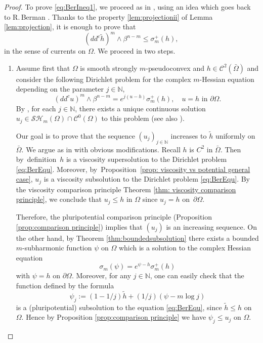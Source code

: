 \documentclass[JEP,XML,SOM,Unicode]{cedram}
\theoremstyle{definition}
\newcommand{\N}{\mathbb{N}}
\newcommand{\Cc}{\mathcal{C}}
\begin{document}
\begin{proof} To prove \eqref{eq:BerIneq1}, we proceed as in \cite{GLZ19}, using an idea which goes back to R.\,Berman \cite{Ber19}. Thanks to the property \eqref{lem:projectionii} of Lemma \ref{lem:projection}, it is enough to prove that
\begin{equation} \label{eq:BerIneq2}
(dd^c \tilde h)^m \wedge \beta^{n - m} \leq \sigma_m^+ (h),
\end{equation}
in the sense of currents on $\Omega$. We proceed in two steps.

\begin{enumerate}
\item
Assume first that $\Omega$ is smooth strongly $m$-pseudoconvex and $h \in \Cc^2 (\bar \Omega)$ and consider the following Dirichlet problem for the complex $m$-Hessian equation depending on the parameter $j \in \N$,
\begin{equation} \label{eq:BerEqu}
(dd^c u)^m \wedge \beta^{n - m} = e^{j (u-h)} \sigma_m^+ (h), \quad u = h\text{ in }\partial \Omega.
\end{equation}
By \cite{Lu13}, for each $j\!\in\!\N$, there exists a unique continuous solution $u_j\!\in\!\mathcal {SH}_m (\Omega) \cap\Cc^0 (\Omega)$ to this problem (see also \cite{Ch16}).

Our goal is to prove that the sequence $(u_j)_{j\in \N}$ increases to $ \tilde h$ uniformly on $\bar{\Omega}$. We argue as in \cite{GLZ19} with obvious modifications. Recall $h$ is $C^2$ in $\bar{\Omega}$. Then by~definition~$h$ is a viscosity supersolution to the Dirichlet problem \eqref{eq:BerEqu}. Moreover, by~Proposition~\ref{prop: viscosity vs potential general case}, $u_j$ is a viscosity subsolution to the Dirichlet problem \eqref{eq:BerEqu}. By the viscosity comparison principle Theorem \ref{thm: viscosity comparison principle}, we conclude that $u_j \leq h$ in $ \Omega$ since $u_j = h$ on~$\partial \Omega$.

Therefore, the pluripotential comparison principle (Proposition \ref{prop:comparison principle}) implies that $(u_j)$ is an increasing sequence.
On the other hand, by Theorem \ref{thm:boundedsubsolution} there exists a bounded $m$-subharmonic function $\psi$ on $\Omega$ which is a solution to the complex Hessian equation
\[
\sigma_m (\psi) = e^{\psi - h} \sigma_m^+ (h)
\]
with $\psi = h$ on $\partial \Omega$.
Moreover, for any $j \in \N$, one can easily check that the function defined by the formula
\[
\psi_j:= (1- 1 \slash j) \tilde h + (1 \slash j) ( \psi - m \log j)
\]
is a (pluripotential) subsolution to the equation \eqref{eq:BerEqu}, since $ \tilde h \leq h$ on $\Omega$. Hence by Proposition \ref{prop:comparison principle} we have $\psi_j \leq u_j$ on $\Omega$.


\end{enumerate}
\end{proof}
\end{document}
